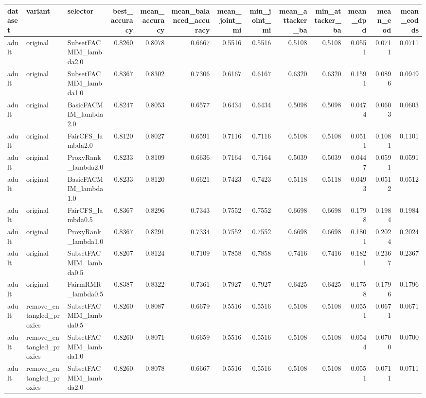 \begin{tabular}{lllrrrrrrrrrr}
\toprule
dataset & variant & selector & best_accuracy & mean_accuracy & mean_balanced_accuracy & mean_joint_mi & min_joint_mi & mean_attacker_ba & min_attacker_ba & mean_dpd & mean_eod & mean_eodds \\
\midrule
adult & original & SubsetFACMIM_lambda2.0 & 0.8260 & 0.8078 & 0.6667 & 0.5516 & 0.5516 & 0.5108 & 0.5108 & 0.0551 & 0.0711 & 0.0711 \\
adult & original & SubsetFACMIM_lambda1.0 & 0.8367 & 0.8302 & 0.7306 & 0.6167 & 0.6167 & 0.6320 & 0.6320 & 0.1591 & 0.0896 & 0.0949 \\
adult & original & BasicFACMIM_lambda2.0 & 0.8247 & 0.8053 & 0.6577 & 0.6434 & 0.6434 & 0.5098 & 0.5098 & 0.0474 & 0.0603 & 0.0603 \\
adult & original & FairCFS_lambda2.0 & 0.8120 & 0.8027 & 0.6591 & 0.7116 & 0.7116 & 0.5108 & 0.5108 & 0.0511 & 0.1081 & 0.1101 \\
adult & original & ProxyRank_lambda2.0 & 0.8233 & 0.8109 & 0.6636 & 0.7164 & 0.7164 & 0.5039 & 0.5039 & 0.0447 & 0.0591 & 0.0591 \\
adult & original & BasicFACMIM_lambda1.0 & 0.8233 & 0.8120 & 0.6621 & 0.7423 & 0.7423 & 0.5118 & 0.5118 & 0.0493 & 0.0512 & 0.0512 \\
adult & original & FairCFS_lambda0.5 & 0.8367 & 0.8296 & 0.7343 & 0.7552 & 0.7552 & 0.6698 & 0.6698 & 0.1798 & 0.1984 & 0.1984 \\
adult & original & ProxyRank_lambda1.0 & 0.8367 & 0.8291 & 0.7334 & 0.7552 & 0.7552 & 0.6698 & 0.6698 & 0.1801 & 0.2024 & 0.2024 \\
adult & original & SubsetFACMIM_lambda0.5 & 0.8207 & 0.8124 & 0.7109 & 0.7858 & 0.7858 & 0.7416 & 0.7416 & 0.1821 & 0.2367 & 0.2367 \\
adult & original & FairmRMR_lambda0.5 & 0.8387 & 0.8322 & 0.7361 & 0.7927 & 0.7927 & 0.6425 & 0.6425 & 0.1758 & 0.1796 & 0.1796 \\
adult & remove_entangled_proxies & SubsetFACMIM_lambda0.5 & 0.8260 & 0.8087 & 0.6679 & 0.5516 & 0.5516 & 0.5108 & 0.5108 & 0.0551 & 0.0671 & 0.0671 \\
adult & remove_entangled_proxies & SubsetFACMIM_lambda1.0 & 0.8260 & 0.8071 & 0.6659 & 0.5516 & 0.5516 & 0.5108 & 0.5108 & 0.0544 & 0.0700 & 0.0700 \\
adult & remove_entangled_proxies & SubsetFACMIM_lambda2.0 & 0.8260 & 0.8078 & 0.6667 & 0.5516 & 0.5516 & 0.5108 & 0.5108 & 0.0551 & 0.0711 & 0.0711 \\

\end{tabular}
